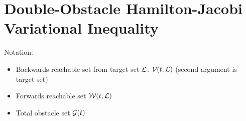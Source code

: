 \section{Double-Obstacle Hamilton-Jacobi Variational Inequality \label{sec:HJIVI}}
Notation:
\begin{itemize}
\item Backwards reachable set from target set $\mathcal{L}$: $\mathcal{V}(t, \mathcal{L})$ (second argument is target set)
\item Forwards reachable set $\mathcal{W}(t, \mathcal{L})$
\item Total obstacle set $\mathcal{G}(t)$
\end{itemize}